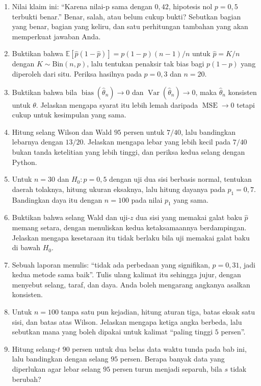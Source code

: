 \begin{latihan}
\begin{enumerate}
  \item Nilai klaim ini: ``Karena nilai-p sama dengan $0{,}42$, hipotesis nol
        $p=0{,}5$ terbukti benar.'' Benar, salah, atau belum cukup bukti? Sebutkan
        bagian yang benar, bagian yang keliru, dan satu perhitungan tambahan yang
        akan memperkuat jawaban Anda.
  \item Buktikan bahwa $\mathbb{E}[\hat p(1-\hat p)]=p(1-p)(n-1)/n$ untuk
        $\hat p=K/n$ dengan $K\sim\mathrm{Bin}(n,p)$, lalu tentukan penaksir tak bias
        bagi $p(1-p)$ yang diperoleh dari situ. Periksa hasilnya pada $p=0{,}3$ dan
        $n=20$.
  \item Buktikan bahwa bila $\operatorname{bias}(\hat\theta_n)\to0$ dan
        $\operatorname{Var}(\hat\theta_n)\to0$, maka $\hat\theta_n$ konsisten untuk
        $\theta$. Jelaskan mengapa syarat itu lebih lemah daripada
        $\operatorname{MSE}\to0$ tetapi cukup untuk kesimpulan yang sama.
  \item Hitung selang Wilson dan Wald $95$ persen untuk $7/40$, lalu bandingkan
        lebarnya dengan $13/20$. Jelaskan mengapa lebar yang lebih kecil pada $7/40$
        bukan tanda ketelitian yang lebih tinggi, dan periksa kedua selang dengan
        Python.
  \item Untuk $n=30$ dan $H_0\colon p=0{,}5$ dengan uji dua sisi berbasis normal,
        tentukan daerah tolaknya, hitung ukuran eksaknya, lalu hitung dayanya pada
        $p_1=0{,}7$. Bandingkan daya itu dengan $n=100$ pada nilai $p_1$ yang sama.
  \item Buktikan bahwa selang Wald dan uji-$z$ dua sisi yang memakai galat baku
        $\hat p$ memang setara, dengan menuliskan kedua ketaksamaannya berdampingan.
        Jelaskan mengapa kesetaraan itu tidak berlaku bila uji memakai galat baku di
        bawah $H_0$.
  \item Sebuah laporan menulis: ``tidak ada perbedaan yang signifikan, $p=0{,}31$,
        jadi kedua metode sama baik''. Tulis ulang kalimat itu sehingga jujur, dengan
        menyebut selang, taraf, dan daya. Anda boleh mengarang angkanya asalkan
        konsisten.
  \item Untuk $n=100$ tanpa satu pun kejadian, hitung aturan tiga, batas eksak satu
        sisi, dan batas atas Wilson. Jelaskan mengapa ketiga angka berbeda, lalu
        sebutkan mana yang boleh dipakai untuk kalimat ``paling tinggi $5$ persen''.
  \item Hitung selang-$t$ $90$ persen untuk dua belas data waktu tunda pada bab ini,
        lalu bandingkan dengan selang $95$ persen. Berapa banyak data yang diperlukan
        agar lebar selang $95$ persen turun menjadi separuh, bila $s$ tidak berubah?
\end{enumerate}


\end{latihan}

